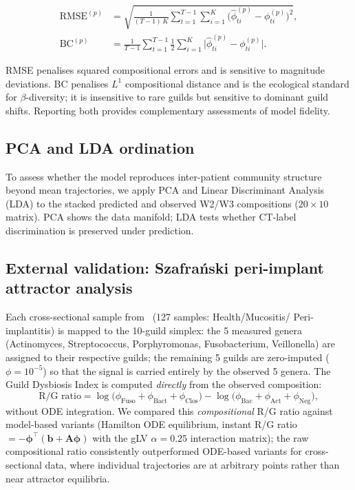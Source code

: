 \documentclass[11pt,a4paper]{article}
\newcommand{\bphi}{\boldsymbol{\phi}}
\newcommand{\bA}{\mathbf{A}}
\newcommand{\bb}{\mathbf{b}}
\begin{document}
\begin{align}
  \text{RMSE}^{(p)} &= \sqrt{\frac{1}{(T-1)\,K}
    \sum_{t=1}^{T-1}\sum_{i=1}^{K}\bigl(\hat\phi_{ti}^{(p)}-\phi_{ti}^{(p)}\bigr)^2},
  \label{eq:rmse}\\[4pt]
  \text{BC}^{(p)} &= \frac{1}{T-1}\sum_{t=1}^{T-1}
    \frac{1}{2}\sum_{i=1}^{K}\bigl|\hat\phi_{ti}^{(p)}-\phi_{ti}^{(p)}\bigr|.
  \label{eq:bc}
\end{align}

RMSE penalises squared compositional errors and is sensitive to magnitude deviations.
BC penalises $L^1$ compositional distance and is the ecological standard for
$\beta$-diversity; it is insensitive to rare guilds but sensitive to dominant guild
shifts. Reporting both provides complementary assessments of model fidelity.

\subsection{PCA and LDA ordination}
\label{ssec:ordination}

To assess whether the model reproduces inter-patient community structure beyond mean
trajectories, we apply PCA and Linear Discriminant Analysis (LDA) to the stacked
predicted and observed W2/W3 compositions ($20 \times 10$ matrix). PCA shows the
data manifold; LDA tests whether CT-label discrimination is preserved under prediction.

\subsection{External validation: Szafra\'{n}ski peri-implant attractor analysis}
\label{ssec:szafranski_attractor}

Each cross-sectional sample from~\citet{szafranski2025} (127 samples: Health/Mucositis/
Peri-implantitis) is mapped to the 10-guild simplex: the 5 measured genera
(Actinomyces, Streptococcus, Porphyromonas, Fusobacterium, Veillonella) are assigned
to their respective guilds; the remaining 5 guilds are zero-imputed ($\phi=10^{-5}$)
so that the signal is carried entirely by the observed 5 genera.  The Guild Dysbiosis
Index is computed \emph{directly} from the observed composition:
\begin{equation}
  \text{R/G ratio} = \log\!\bigl(\phi_\text{Fuso}+\phi_\text{Bact}+\phi_\text{Clos}\bigr)
             - \log\!\bigl(\phi_\text{Bac}+\phi_\text{Act}+\phi_\text{Neg}\bigr),
  \label{eq:gdi}
\end{equation}
without ODE integration.  We compared this \emph{compositional} R/G ratio against
model-based variants (Hamilton ODE equilibrium, instant R/G ratio $= -\bphi^\top(\bb+\bA\bphi)$
with the gLV $\alpha=0.25$ interaction matrix); the raw compositional ratio consistently
outperformed ODE-based variants for cross-sectional data, where individual trajectories
are at arbitrary points rather than near attractor equilibria.
\end{document}
